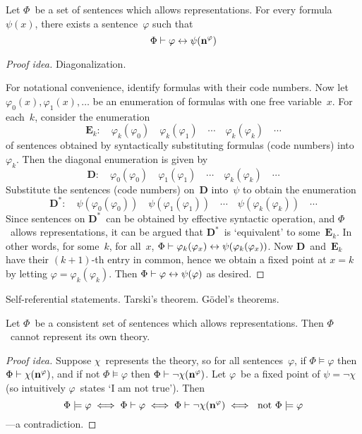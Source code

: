 \begin{thm}
Let \(\Phi\)~be a set of sentences which allows representations. For every formula~\(\psi(x)\), there exists a sentence~\(\varphi\) such that
\[\Phi\vdash\varphi\leftrightarrow\psi(\mathbf{{n}}^{{\varphi}})\]
\end{thm}
\begin{proof}[Proof idea]
Diagonalization.

For notational convenience, identify formulas with their code numbers. Now let \(\varphi_0(x),\varphi_1(x),\ldots\) be an enumeration of formulas with one free variable~\(x\). For each~\(k\), consider the enumeration
\[\mathbf{E}_k:\quad\varphi_k(\varphi_0)\quad\varphi_k(\varphi_1)\quad\cdots\quad\varphi_k(\varphi_k)\quad\cdots\]
of sentences obtained by syntactically substituting formulas (code numbers) into~\(\varphi_k\). Then the diagonal enumeration is given by
\[\mathbf{D}:\quad\varphi_0(\varphi_0)\quad\varphi_1(\varphi_1)\quad\cdots\quad\varphi_k(\varphi_k)\quad\cdots\]
Substitute the sentences (code numbers) on~\(\mathbf{D}\) into~\(\psi\) to obtain the enumeration
\[\mathbf{D}^*:\quad\psi(\varphi_0(\varphi_0))\quad\psi(\varphi_1(\varphi_1))\quad\cdots\quad\psi(\varphi_k(\varphi_k))\quad\cdots\]
Since sentences on \(\mathbf{D}^*\)~can be obtained by effective syntactic operation, and \(\Phi\)~allows representations, it can be argued that \(\mathbf{D}^*\)~is `equivalent' to some~\(\mathbf{E}_k\). In other words, for some~\(k\), for all~\(x\), \(\Phi\vdash\varphi_k(\varphi_x)\leftrightarrow\psi(\varphi_k(\varphi_x))\). Now \(\mathbf{D}\)~and~\(\mathbf{E}_k\) have their \((k+1)\)-th entry in common, hence we obtain a fixed point at \(x=k\) by letting \(\varphi=\varphi_k(\varphi_k)\). Then \(\Phi\vdash\varphi\leftrightarrow\psi(\varphi)\) as desired.
\end{proof}
\begin{app}
Self-referential statements. Tarski's theorem. G\"odel's theorems.
\end{app}

\begin{thm}[Tarski]
Let \(\Phi\)~be a consistent set of sentences which allows representations. Then \(\Phi\)~cannot represent its own theory.
\end{thm}
\begin{proof}[Proof idea]
Suppose \(\chi\)~represents the theory, so for all sentences~\(\varphi\), if \(\Phi\models\varphi\) then \(\Phi\vdash\chi(\mathbf{{n}}^{{\varphi}})\), and if not \(\Phi\models\varphi\) then \(\Phi\vdash\lnot\chi(\mathbf{{n}}^{{\varphi}})\). Let \(\varphi\)~be a fixed point of \(\psi=\lnot\chi\) (so intuitively \(\varphi\)~states `I am not true'). Then
\[\Phi\models\varphi\iff\Phi\vdash\varphi\iff\Phi\vdash\lnot\chi(\mathbf{{n}}^{{\varphi}})\iff\text{ not }\Phi\models\varphi\]
---a contradiction.
\end{proof}

